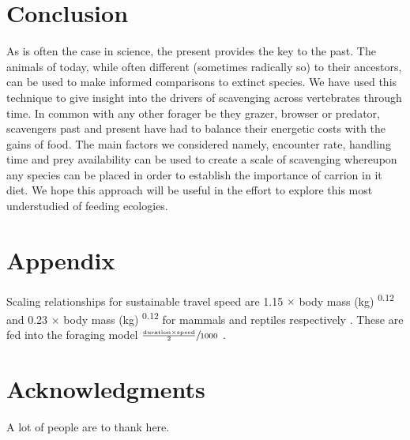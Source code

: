 \documentclass[a4paper,12pt]{article}
\begin{document}
\section*{Conclusion} 
As is often the case in science, the present provides the key to the past.
The animals of today, while often different (sometimes radically so) to their ancestors, can be used to make informed comparisons to extinct species. 
We have used this technique to give insight into the drivers of scavenging across vertebrates through time.
In common with any other forager be they grazer, browser or predator, scavengers past and present have had to balance their energetic costs with the gains of food. 
The main factors we considered namely, encounter rate, handling time and prey availability can be used to create a scale of scavenging whereupon any species can be placed in order to establish the importance of carrion in it diet.
We hope this approach will be useful in the effort to explore this most understudied of feeding ecologies. 

\section*{Appendix}
Scaling relationships for sustainable travel speed are 1.15 $\times$ body mass (kg) \textsuperscript{0.12} and 0.23 $\times$ body mass (kg) \textsuperscript{0.12} for mammals and reptiles respectively \citep{ruxton2004obligate}.
These are fed into the foraging model $\sfrac{\frac{\text{duration} \times \text{speed}}{2}}{1000}$ \citep{Enstipp2006Energetics}.

\section*{Acknowledgments}

A lot of people are to thank here.


\newpage



\end{document}
